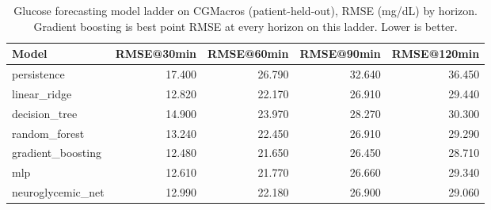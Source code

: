 \begin{table}[t]
\centering
\caption{Glucose forecasting model ladder on CGMacros (patient-held-out), RMSE (mg/dL) by horizon. Gradient boosting is best point RMSE at every horizon on this ladder. Lower is better.}
\label{tab:glucose}
\begin{tabular}{lrrrr}
\toprule
Model & RMSE@30min & RMSE@60min & RMSE@90min & RMSE@120min \\
\midrule
persistence & 17.400 & 26.790 & 32.640 & 36.450 \\
linear\_ridge & 12.820 & 22.170 & 26.910 & 29.440 \\
decision\_tree & 14.900 & 23.970 & 28.270 & 30.300 \\
random\_forest & 13.240 & 22.450 & 26.910 & 29.290 \\
gradient\_boosting & 12.480 & 21.650 & 26.450 & 28.710 \\
mlp & 12.610 & 21.770 & 26.660 & 29.340 \\
neuroglycemic\_net & 12.990 & 22.180 & 26.900 & 29.060 \\
\bottomrule
\end{tabular}
\end{table}
